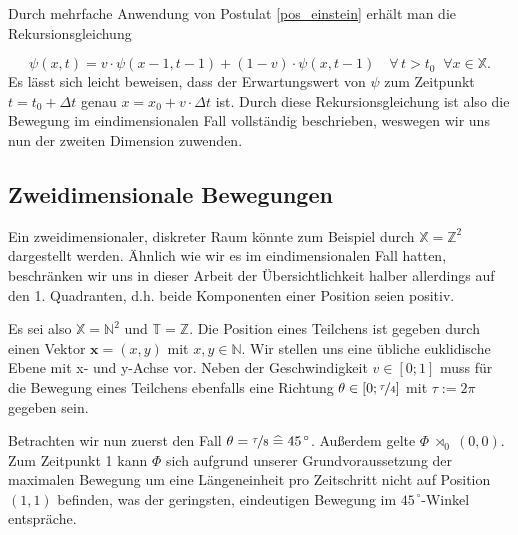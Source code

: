 \documentclass[a4paper,12pt,ngerman]{scrartcl}
\theoremstyle{plain}
\theoremstyle{plain}
\theoremstyle{plain}
\theoremstyle{plain}
\newcommand{\Z}{\mathbb{Z}}
\newcommand{\T}{\mathbb{T}}
\newcommand{\X}{\mathbb{X}}
\newcommand{\N}{\mathbb{N}}
\newcommand{\at}[1]{\;\rtimes_{#1}\;}
\begin{document}
Durch mehrfache Anwendung von Postulat \ref{pos_einstein} erhält man die Rekursionsgleichung

{
\[\psi(x,t)=v\cdot\psi(x-1,t-1)+(1-v)\cdot\psi(x,t-1) \quad\forall\, t>t_0 \;\;\forall x\in\X.\]
}
Es lässt sich leicht beweisen, dass der Erwartungswert von $\psi$ zum Zeitpunkt $t=t_0+\Delta t$ genau $x=x_0+v\cdot\Delta t$ ist. Durch diese Rekursionsgleichung ist also die Bewegung im eindimensionalen Fall vollständig beschrieben, weswegen wir uns nun der zweiten Dimension zuwenden.



\subsection{Zweidimensionale Bewegungen}

Ein zweidimensionaler, diskreter Raum könnte zum Beispiel durch $\X=\Z^2$ dargestellt werden. Ähnlich wie wir es im eindimensionalen Fall hatten, beschränken wir uns in dieser Arbeit der Übersichtlichkeit halber allerdings auf den 1. Quadranten, d.h. beide Komponenten einer Position seien positiv. 

Es sei also $\X=\N^2$ und $\T=\Z$. Die Position eines Teilchens ist gegeben durch einen Vektor $\pmb{x}=(x,y)$ mit $x,y\in\N$. Wir stellen uns eine übliche euklidische Ebene mit x- und y-Achse vor. Neben der Geschwindigkeit $v\in[0;1]$ muss für die Bewegung eines Teilchens ebenfalls eine Richtung $\theta\in[0;\nicefrac{\tau}{4}]$ mit $\tau:=2\pi$ gegeben sein.

Betrachten wir nun zuerst den Fall $\theta=\nicefrac{\tau}{8}\;\widehat{=}\;45^{\,\circ}$. Außerdem gelte $\Phi\at{0} (0,0)$. Zum Zeitpunkt 1 kann $\Phi$ sich aufgrund unserer Grundvoraussetzung der maximalen Bewegung um eine Längeneinheit pro Zeitschritt nicht auf Position $(1,1)$ befinden, was der geringsten, eindeutigen Bewegung im $45^{\,\circ}$-Winkel entspräche.
\end{document}
